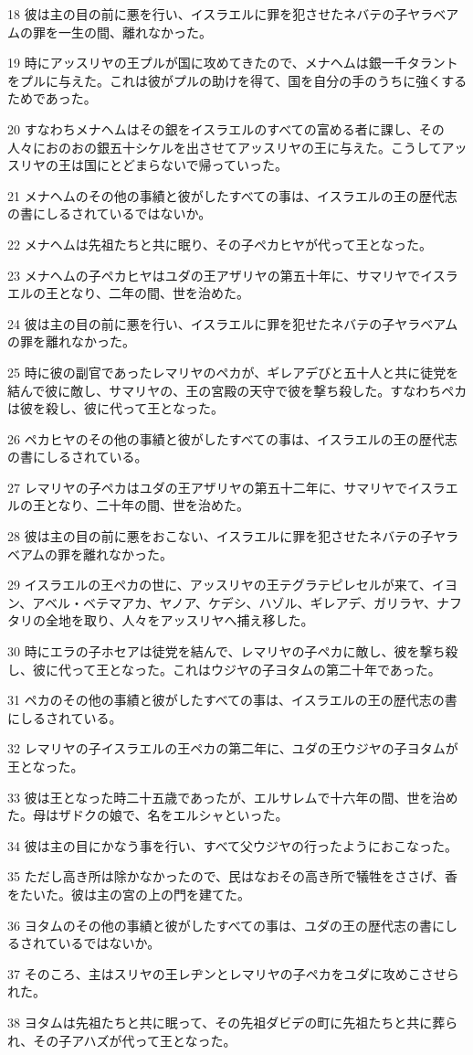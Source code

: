 \par 18 彼は主の目の前に悪を行い、イスラエルに罪を犯させたネバテの子ヤラベアムの罪を一生の間、離れなかった。
\par 19 時にアッスリヤの王プルが国に攻めてきたので、メナヘムは銀一千タラントをプルに与えた。これは彼がプルの助けを得て、国を自分の手のうちに強くするためであった。
\par 20 すなわちメナヘムはその銀をイスラエルのすべての富める者に課し、その人々におのおの銀五十シケルを出させてアッスリヤの王に与えた。こうしてアッスリヤの王は国にとどまらないで帰っていった。
\par 21 メナヘムのその他の事績と彼がしたすべての事は、イスラエルの王の歴代志の書にしるされているではないか。
\par 22 メナヘムは先祖たちと共に眠り、その子ペカヒヤが代って王となった。
\par 23 メナヘムの子ペカヒヤはユダの王アザリヤの第五十年に、サマリヤでイスラエルの王となり、二年の間、世を治めた。
\par 24 彼は主の目の前に悪を行い、イスラエルに罪を犯せたネバテの子ヤラベアムの罪を離れなかった。
\par 25 時に彼の副官であったレマリヤのペカが、ギレアデびと五十人と共に徒党を結んで彼に敵し、サマリヤの、王の宮殿の天守で彼を撃ち殺した。すなわちペカは彼を殺し、彼に代って王となった。
\par 26 ペカヒヤのその他の事績と彼がしたすべての事は、イスラエルの王の歴代志の書にしるされている。
\par 27 レマリヤの子ペカはユダの王アザリヤの第五十二年に、サマリヤでイスラエルの王となり、二十年の間、世を治めた。
\par 28 彼は主の目の前に悪をおこない、イスラエルに罪を犯させたネバテの子ヤラベアムの罪を離れなかった。
\par 29 イスラエルの王ペカの世に、アッスリヤの王テグラテピレセルが来て、イヨン、アベル・ベテマアカ、ヤノア、ケデシ、ハゾル、ギレアデ、ガリラヤ、ナフタリの全地を取り、人々をアッスリヤへ捕え移した。
\par 30 時にエラの子ホセアは徒党を結んで、レマリヤの子ペカに敵し、彼を撃ち殺し、彼に代って王となった。これはウジヤの子ヨタムの第二十年であった。
\par 31 ペカのその他の事績と彼がしたすべての事は、イスラエルの王の歴代志の書にしるされている。
\par 32 レマリヤの子イスラエルの王ペカの第二年に、ユダの王ウジヤの子ヨタムが王となった。
\par 33 彼は王となった時二十五歳であったが、エルサレムで十六年の間、世を治めた。母はザドクの娘で、名をエルシャといった。
\par 34 彼は主の目にかなう事を行い、すべて父ウジヤの行ったようにおこなった。
\par 35 ただし高き所は除かなかったので、民はなおその高き所で犠牲をささげ、香をたいた。彼は主の宮の上の門を建てた。
\par 36 ヨタムのその他の事績と彼がしたすべての事は、ユダの王の歴代志の書にしるされているではないか。
\par 37 そのころ、主はスリヤの王レヂンとレマリヤの子ペカをユダに攻めこさせられた。
\par 38 ヨタムは先祖たちと共に眠って、その先祖ダビデの町に先祖たちと共に葬られ、その子アハズが代って王となった。

